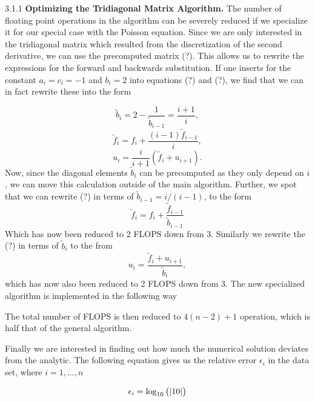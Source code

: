 \documentclass[a4paper,10pt]{article}
\begin{document}
\bigskip

3.1.1 \textbf{Optimizing the Tridiagonal Matrix Algorithm.}
The number of floating point operations in the algorithm can be severely reduced if we specialize it for our special case with the Poisson equation. Since we are only interested in the tridiagonal matrix which resulted from the discretization of the second derivative, we can use the precomputed matrix (?). This allows us to rewrite the expressions for the forward and backwards substitution. If one inserts for the constant $a_i =  c_i = -1$ and $b_i = 2$ into equations (?) and (?), we find that we can in fact rewrite these into the form

\begin{equation}
\tilde{b}_i = 2 - \frac{1}{\tilde{b}_{i-1}} = \frac{i+1}{i},
\end{equation}
\begin{equation}
\tilde{f}_i = f_i + \frac{(i-1)\tilde{f}_{i-1}}{i},
\end{equation}
\begin{equation}
u_{i} = \frac{i}{i+1}(\tilde{f}_{i} +u_{i+1}).
\end{equation}
Now, since the diagonal elements $\tilde{b}_i$ can be precomputed as they only depend on $i$, we can move this calculation outside of the main algorithm. Further, we spot that we can rewrite (?) in terms of $\tilde{b}_{i-1} = i/(i-1) $, to the form
\begin{equation}
\tilde{f}_i = f_i + \frac{\tilde{f}_{i-1}}{\tilde{b}_{i-1}}
\end{equation}
Which has now been reduced to 2 FLOPS down from 3. Similarly we rewrite the (?) in terms of $\tilde{b}_i$ to the from
\begin{equation}
u_i = \frac{\tilde{f}_i + u_{i+1}}{\tilde{b}_i},
\end{equation}
which has now also been reduced to 2 FLOPS down from 3. 
\newpage
The new specialized algorithm is implemented in the
 following way

The total number of FLOPS is then reduced to $4(n-2) + 1$ operation, which is half that of the general algorithm. 

Finally we are interested in finding out how much the numerical solution deviates from the analytic. The following equation gives us the relative error $\epsilon_i$ in the data set, where $i = 1, ...,n$

\begin{equation}
\epsilon_i = \log_{10} \left( \abs{10} \right)
\end{equation}
\end{document}
